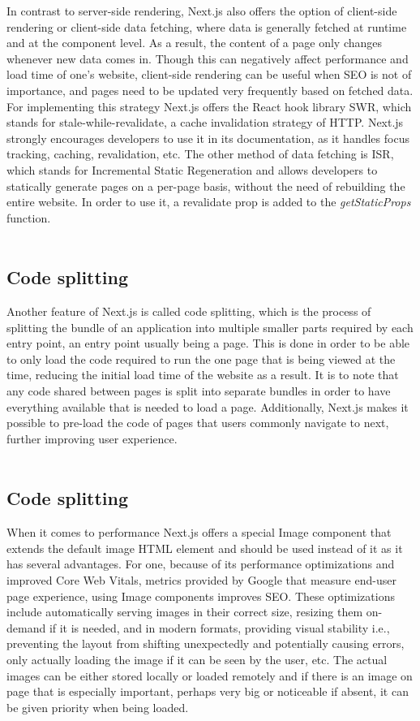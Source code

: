 In contrast to server-side rendering, Next.js also offers the
option of client-side rendering or client-side data fetching, where data is generally fetched at runtime and at the component level. As a
result, the content of a page only changes whenever new data comes in. Though this can negatively affect performance and load time of one's
website, client-side rendering can be useful when SEO is not of importance, and pages need to be updated very frequently based on fetched data.
For implementing this strategy Next.js offers the React hook library SWR, which stands for stale-while-revalidate, a cache invalidation strategy
of HTTP. Next.js strongly encourages developers to use it in its documentation, as it handles focus tracking, caching, revalidation, etc. The
other method of data fetching is ISR, which stands for Incremental Static Regeneration and allows developers to statically generate pages on a
per-page basis, without the need of rebuilding the entire website. In order to use it, a revalidate prop is added to the \emph{getStaticProps} function.
\\
\\
\subsection{Code splitting}
Another feature of Next.js is called code splitting, which is the process of splitting the bundle of an application into multiple smaller parts
required by each entry point, an entry point usually being a page. This is done in order to be able to only load the code required to run the one
page that is being viewed at the time, reducing the initial load time of the website as a result. It is to note that any code shared between pages
is split into separate bundles in order to have everything available that is needed to load a page. Additionally, Next.js makes it possible to
pre-load the code of pages that users commonly navigate to next, further improving user experience.
\\
\\
\subsection{Code splitting}
When it comes to performance Next.js offers a special Image component that extends the default image HTML element and should be used instead of
it as it has several advantages. For one, because of its performance optimizations and improved Core Web Vitals, metrics provided by Google that
measure end-user page experience, using Image components improves SEO. These optimizations include automatically serving images in their correct
size, resizing them on-demand if it is needed, and in modern formats, providing visual stability i.e., preventing the layout from shifting unexpectedly
and potentially causing errors, only actually loading the image if it can be seen by the user, etc. The actual images can be either stored locally
or loaded remotely and if there is an image on page that is especially important, perhaps very big or noticeable if absent, it can be given priority
when being loaded.
\\
\\
